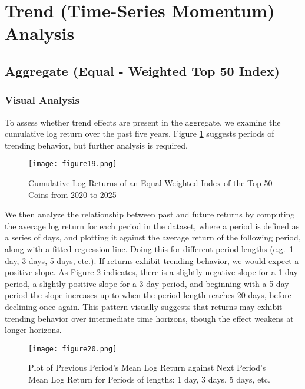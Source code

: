 \documentclass[
]{article}
\begin{document}
\section{Trend (Time-Series Momentum)
Analysis}\label{trend-time-series-momentum-analysis}

\subsection{Aggregate (Equal - Weighted Top 50
Index)}\label{aggregate-equal---weighted-top-50-index}

\subsubsection{Visual Analysis}\label{visual-analysis-4}

To assess whether trend effects are present in the aggregate, we examine
the cumulative log return over the past five years. Figure
\textcolor{blue}{\ref{fig:19}} suggests periods of trending behavior,
but further analysis is required.

\begin{figure}[H]
    \centering
    \texttt{[image: figure19.png]}
    \caption{Cumulative Log Returns of an Equal-Weighted Index of the Top 50 Coins from 2020 to 2025}
    \label{fig:19}
\end{figure}

We then analyze the relationship between past and future returns by
computing the average log return for each period in the dataset, where a
period is defined as a series of days, and plotting it against the
average return of the following period, along with a fitted regression
line. Doing this for different period lengths (e.g.~1 day, 3 days, 5
days, etc.). If returns exhibit trending behavior, we would expect a
positive slope. As Figure \textcolor{blue}{\ref{fig:20}} indicates,
there is a slightly negative slope for a 1-day period, a slightly
positive slope for a 3-day period, and beginning with a 5-day period the
slope increases up to when the period length reaches 20 days, before
declining once again. This pattern visually suggests that returns may
exhibit trending behavior over intermediate time horizons, though the
effect weakens at longer horizons.

\begin{figure}[H]
    \centering
    \texttt{[image: figure20.png]}
    \caption{Plot of Previous Period's Mean Log Return against Next Period's Mean Log Return for Periods of lengths: 1 day, 3 days, 5 days, etc.}
    \label{fig:20}
\end{figure}
\end{document}

